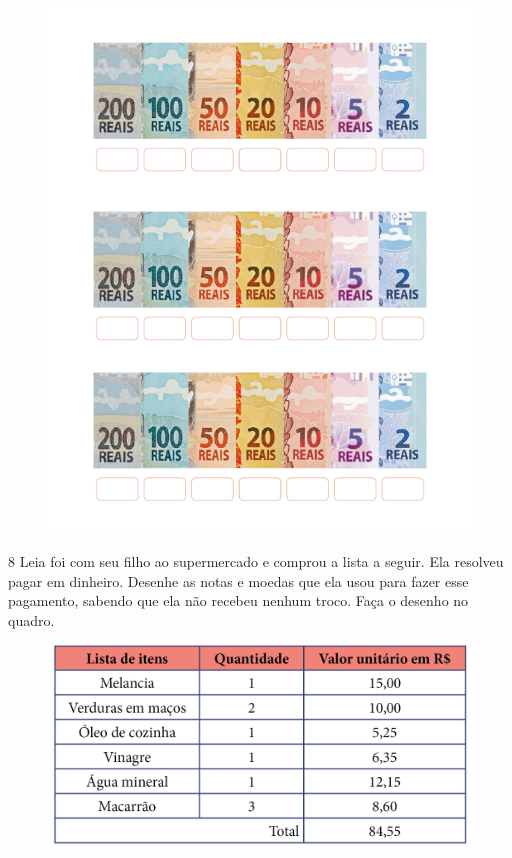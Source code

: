 \begin{figure}[htpb!]
\includegraphics[width=.9\textwidth]{./media/image70.png}
\end{figure}



\pagebreak

\num{8} Leia foi com seu filho ao supermercado e comprou a lista a seguir. Ela
resolveu pagar em dinheiro. Desenhe as notas e moedas que ela usou para
fazer esse pagamento, sabendo que ela não recebeu nenhum troco. Faça o
desenho no quadro.


\begin{figure}[htpb!]
\includegraphics[width=\textwidth]{./media/image75.png}
\end{figure}

